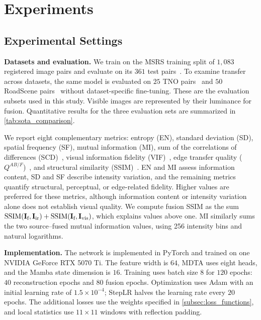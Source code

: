 \section{Experiments}\label{sec:exp}


\subsection{Experimental Settings}\label{subsec:exp_settings}
\textbf{Datasets and evaluation.}
We train on the MSRS training split of $1,083$ registered image pairs and evaluate on its $361$ test pairs~\cite{tang2022seafusion}. To examine transfer across datasets, the same model is evaluated on $25$ TNO pairs~\cite{toet2017tno} and $50$ RoadScene pairs~\cite{xu2022u2fusion} without dataset-specific fine-tuning. These are the evaluation subsets used in this study. Visible images are represented by their luminance for fusion. Quantitative results for the three evaluation sets are summarized in \cref{tab:sota_comparison}.

We report eight complementary metrics: entropy (EN), standard deviation (SD), spatial frequency (SF), mutual information (MI), sum of the correlations of differences (SCD)~\cite{aslantas2015scd}, visual information fidelity (VIF)~\cite{sheikh2006vif}, edge transfer quality ($Q^{AB/F}$)~\cite{xydeas2000qabf}, and structural similarity (SSIM)~\cite{wang2004ssim}. EN and MI assess information content, SD and SF describe intensity variation, and the remaining metrics quantify structural, perceptual, or edge-related fidelity. Higher values are preferred for these metrics, although information content or intensity variation alone does not establish visual quality. We compute fusion SSIM as the sum $\operatorname{SSIM}(\mathbf{I}_{\text{f}},\mathbf{I}_{\text{ir}})+\operatorname{SSIM}(\mathbf{I}_{\text{f}},\mathbf{I}_{\text{vis}})$, which explains values above one. MI similarly sums the two source--fused mutual information values, using 256 intensity bins and natural logarithms.

\textbf{Implementation.}
The network is implemented in PyTorch and trained on one NVIDIA GeForce RTX 5070 Ti. The feature width is $64$, MDTA uses eight heads, and the Mamba state dimension is $16$. Training uses batch size $8$ for $120$ epochs: $40$ reconstruction epochs and $80$ fusion epochs. Optimization uses Adam with an initial learning rate of $1.5\times10^{-4}$; StepLR halves the learning rate every $20$ epochs. The additional losses use the weights specified in \cref{subsec:loss_functions}, and local statistics use $11\times11$ windows with reflection padding.

